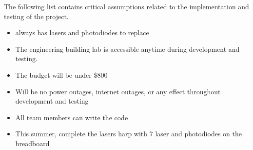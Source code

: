 The following list contains critical assumptions related to the implementation and testing of the project.

\begin{itemize}
  \item always has lasers and photodiodes to replace
  \item The engineering building lab is accessible anytime during development and testing.
  \item The budget will be under \$800
  \item Will be no power outages, internet outages, or any effect throughout development and testing
  \item All team members can write the code
  \item This summer, complete the lasers harp with 7 laser and photodiodes on the breadboard
\end{itemize}